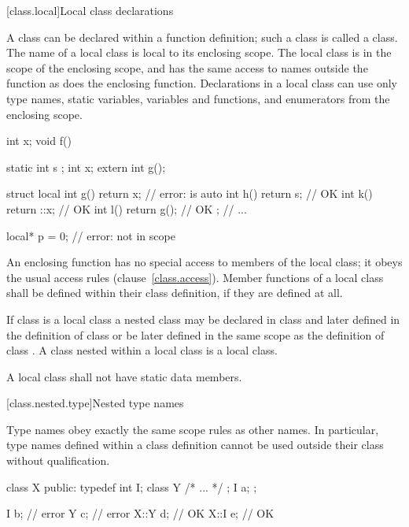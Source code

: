 [class.local]{Local class declarations}
%
%

\pnum
A class can be declared within a function definition; such a class is
called a  class. The name of a local class is local to
its enclosing scope.
%
The local class is in the scope of the enclosing scope, and has the same
access to names outside the function as does the enclosing function.
Declarations in a local class can use only type names, static variables,
 variables and functions, and enumerators from the
enclosing scope.
\enterexample
{}%
\begin{codeblock}
int x;
void f()
{
    static int s ;
    int x;
    extern int g();

    struct local {
	int g() { return x; }   // error:  is auto
	int h() { return s; }   // OK
	int k() { return ::x; } // OK
	int l() { return g(); } // OK
    };
    // ...
}

local* p = 0;                   // error:  not in scope
\end{codeblock}
\exitexampleb

\pnum
An enclosing function has no special access to members of the local
class; it obeys the usual access rules (clause~\ref{class.access}).
%
Member functions of a local class shall be defined within their class
definition, if they are defined at all.

\pnum
{}%
If class  is a local class a nested class  may be
declared in class  and later defined in the definition of class
 or be later defined in the same scope as the definition of
class .
%
A class nested within
a local class is a local class.

\pnum
A local class shall not have static data members.

[class.nested.type]{Nested type names}
%
%

\pnum
Type names obey exactly the same scope rules as other names. In
particular, type names defined within a class definition cannot be used
outside their class without qualification.
\enterexample

%
\begin{codeblock}
class X {
public:
    typedef int I;
    class Y { /* ... */ };
    I a;
};

I b;                            // error
Y c;                            // error
X::Y d;                         // OK
X::I e;                         // OK
\end{codeblock}
\exitexampleb%
